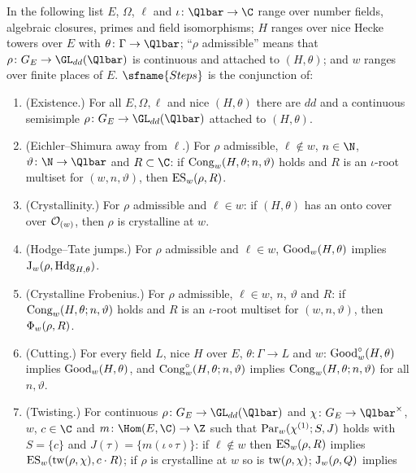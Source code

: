 \begin{definition}\label{def:pf:steps2:steps}
In the following list $E$, $\Omega$, $\ell$ and $\iota\colon\Qlbar\to\C$ range over number fields,
algebraic closures, primes and field isomorphisms; $H$ ranges over nice Hecke towers over $E$ with
$\theta\colon\Gamma\to\Qlbar$; ``$\rho$ admissible'' means that $\rho\colon G_E\to\GL_{dd}(\Qlbar)$ is
continuous and attached to $(H,\theta)$; and $w$ ranges over finite places of $E$.
$\sfname{Steps}$ is the conjunction of:
\begin{enumerate}[label=\textup{(S\arabic*)},leftmargin=3.2em,nosep]
\item (Existence.) For all $E,\Omega,\ell$ and nice $(H,\theta)$ there are $dd$ and a continuous
  semisimple $\rho\colon G_E\to\GL_{dd}(\Qlbar)$ attached to $(H,\theta)$.
\item (Eichler--Shimura away from $\ell$.) For $\rho$ admissible, $\ell\notin w$, $n\in\N$,
  $\vartheta\colon\N\to\Qlbar$ and $R\subset\C$: if $\mathrm{Cong}_w(H,\theta;n,\vartheta)$ holds and $R$
  is an $\iota$-root multiset for $(w,n,\vartheta)$, then $\mathrm{ES}_w(\rho,R)$.
\item (Crystallinity.) For $\rho$ admissible and $\ell\in w$: if $(H,\theta)$ has an onto cover over
  $\mathcal{O}_{(w)}$, then $\rho$ is crystalline at $w$.
\item (Hodge--Tate jumps.) For $\rho$ admissible and $\ell\in w$, $\mathrm{Good}_w(H,\theta)$ implies
  $\mathrm{J}_w(\rho,\mathrm{Hdg}_{H,\theta})$.
\item (Crystalline Frobenius.) For $\rho$ admissible, $\ell\in w$, $n$, $\vartheta$ and $R$: if
  $\mathrm{Cong}_w(H,\theta;n,\vartheta)$ holds and $R$ is an $\iota$-root multiset for
  $(w,n,\vartheta)$, then $\Phi_w(\rho,R)$.
\item (Cutting.) For every field $L$, nice $H$ over $E$, $\theta\colon\Gamma\to L$ and $w$:
  $\mathrm{Good}^\circ_w(H,\theta)$ implies $\mathrm{Good}_w(H,\theta)$, and
  $\mathrm{Cong}^\circ_w(H,\theta;n,\vartheta)$ implies $\mathrm{Cong}_w(H,\theta;n,\vartheta)$ for all
  $n,\vartheta$.
\item[(S7)--(S10)] (Twisting.) For continuous $\rho\colon G_E\to\GL_{dd}(\Qlbar)$ and
  $\chi\colon G_E\to\Qlbar^\times$, $w$, $c\in\C$ and $m\colon\Hom(E,\C)\to\Z$ such that
  $\mathrm{Par}_w(\chi^{(1)};S,J)$ holds with $S=\{c\}$ and $J(\tau)=\{m(\iota\circ\tau)\}$: if
  $\ell\notin w$ then $\mathrm{ES}_w(\rho,R)$ implies $\mathrm{ES}_w(\mathrm{tw}(\rho,\chi),c\cdot R)$;
  if $\rho$ is crystalline at $w$ so is $\mathrm{tw}(\rho,\chi)$; $\mathrm{J}_w(\rho,Q)$ implies

\end{enumerate}
\end{definition}
